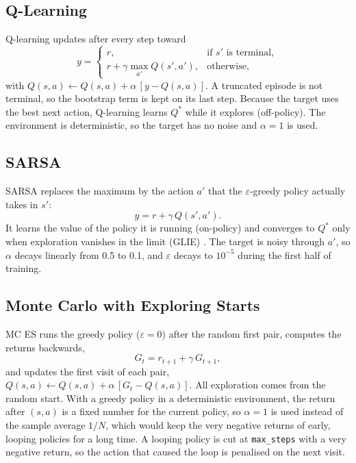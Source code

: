 \documentclass[conference]{IEEEtran}
\newcommand{\Qs}{Q^{*}}
\newcommand{\eps}{\varepsilon}
\begin{document}
\subsection{Q-Learning}
Q-learning \cite{b2} updates after every step toward
\begin{equation}
y=\begin{cases} r, & \text{if } s' \text{ is terminal},\\ r+\gamma\max_{a'}Q(s',a'), & \text{otherwise},\end{cases}\label{eq:ql}
\end{equation}
with $Q(s,a)\leftarrow Q(s,a)+\alpha\,[y-Q(s,a)]$. A truncated episode is not terminal, so the bootstrap term is kept on its last step. Because the target uses the best next action, Q-learning learns $\Qs$ while it explores (off-policy). The environment is deterministic, so the target has no noise and $\alpha=1$ is used.

\subsection{SARSA}
SARSA \cite{b3} replaces the maximum by the action $a'$ that the $\eps$-greedy policy actually takes in $s'$:
\begin{equation}
y=r+\gamma\,Q(s',a').\label{eq:sarsa}
\end{equation}
It learns the value of the policy it is running (on-policy) and converges to $\Qs$ only when exploration vanishes in the limit (GLIE) \cite{b7}. The target is noisy through $a'$, so $\alpha$ decays linearly from 0.5 to 0.1, and $\eps$ decays to $10^{-5}$ during the first half of training.

\subsection{Monte Carlo with Exploring Starts}
MC ES \cite{b1} runs the greedy policy ($\eps=0$) after the random first pair, computes the returns backwards,
\begin{equation}
G_t=r_{t+1}+\gamma\,G_{t+1},
\end{equation}
and updates the first visit of each pair, $Q(s,a)\leftarrow Q(s,a)+\alpha\,[G_t-Q(s,a)]$. All exploration comes from the random start. With a greedy policy in a deterministic environment, the return after $(s,a)$ is a fixed number for the current policy, so $\alpha=1$ is used instead of the sample average $1/N$, which would keep the very negative returns of early, looping policies for a long time. A looping policy is cut at \texttt{max\_steps} with a very negative return, so the action that caused the loop is penalised on the next visit.
\end{document}
